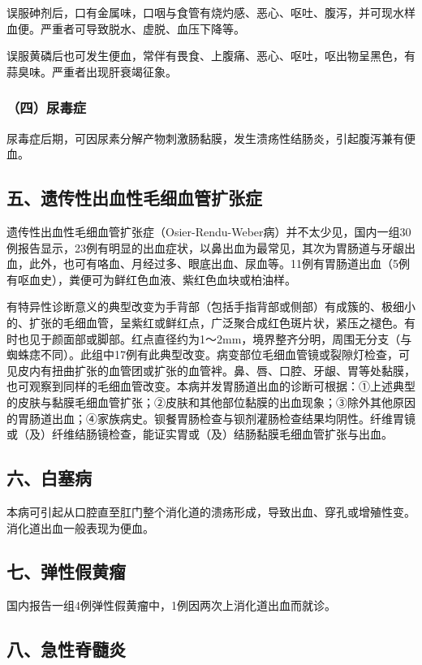 误服砷剂后，口有金属味，口咽与食管有烧灼感、恶心、呕吐、腹泻，并可现水样血便。严重者可导致脱水、虚脱、血压下降等。

误服黄磷后也可发生便血，常伴有畏食、上腹痛、恶心、呕吐，呕出物呈黑色，有蒜臭味。严重者出现肝衰竭征象。

\subsubsection{（四）尿毒症}

尿毒症后期，可因尿素分解产物刺激肠黏膜，发生溃疡性结肠炎，引起腹泻兼有便血。

\subsection{五、遗传性出血性毛细血管扩张症}

遗传性出血性毛细血管扩张症（Osier-Rendu-Weber病）并不太少见，国内一组30例报告显示，23例有明显的出血症状，以鼻出血为最常见，其次为胃肠道与牙龈出血，此外，也可有咯血、月经过多、眼底出血、尿血等。11例有胃肠道出血（5例有呕血史），粪便可为鲜红色血液、紫红色血块或柏油样。

有特异性诊断意义的典型改变为手背部（包括手指背部或侧部）有成簇的、极细小的、扩张的毛细血管，呈紫红或鲜红点，广泛聚合成红色斑片状，紧压之褪色。有时也见于颜面部或脚部。红点直径约为1～2mm，境界整齐分明，周围无分支（与蜘蛛痣不同）。此组中17例有此典型改变。病变部位毛细血管镜或裂隙灯检查，可见皮内有扭曲扩张的血管团或扩张的血管袢。鼻、唇、口腔、牙龈、胃等处黏膜，也可观察到同样的毛细血管改变。本病并发胃肠道出血的诊断可根据：①上述典型的皮肤与黏膜毛细血管扩张；②皮肤和其他部位黏膜的出血现象；③除外其他原因的胃肠道出血；④家族病史。钡餐胃肠检查与钡剂灌肠检查结果均阴性。纤维胃镜或（及）纤维结肠镜检查，能证实胃或（及）结肠黏膜毛细血管扩张与出血。

\subsection{六、白塞病}

本病可引起从口腔直至肛门整个消化道的溃疡形成，导致出血、穿孔或增殖性变。消化道出血一般表现为便血。

\subsection{七、弹性假黄瘤}

国内报告一组4例弹性假黄瘤中，1例因两次上消化道出血而就诊。

\subsection{八、急性脊髓炎}

